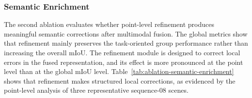 \subsubsection{Semantic Enrichment}
The second ablation evaluates whether point-level refinement produces meaningful semantic corrections after multimodal fusion. The global metrics show that refinement mainly preserves the task-oriented group performance rather than increasing the overall mIoU.  The refinement module is designed to correct local errors in the fused representation, and its effect is more pronounced at the point level than at the global mIoU level. Table~\ref{tab:ablation-semantic-enrichment} shows that refinement makes structured local corrections, as evidenced by the point-level analysis of three representative sequence-08 scenes.
\begin{table}[t]
  \centering
  \caption{Effect of semantic enrichment on the sequence-level segmentation
  metrics. All values are percentages.}
  \label{tab:ablation-semantic-enrichment}
  \small
  \setlength{\tabcolsep}{3.5pt}
  \renewcommand{\arraystretch}{1.08}
\end{table}
